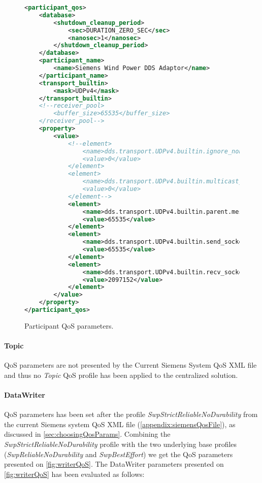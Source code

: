 \begin{figure}
\begin{lstlisting}[language=XML]
<participant_qos>
	<database>
		<shutdown_cleanup_period>
			<sec>DURATION_ZERO_SEC</sec>
			<nanosec>1</nanosec>
		</shutdown_cleanup_period>
	</database>
	<participant_name>
		<name>Siemens Wind Power DDS Adaptor</name>
	</participant_name>
	<transport_builtin>
		<mask>UDPv4</mask>
	</transport_builtin>
	<!--receiver_pool>
		<buffer_size>65535</buffer_size>
	</receiver_pool-->
	<property>
		<value>
			<!--element>
				<name>dds.transport.UDPv4.builtin.ignore_nonup_interfaces</name>
				<value>0</value>
			</element>
			<element>
				<name>dds.transport.UDPv4.builtin.multicast_enabled</name>
				<value>0</value>
			</element-->
			<element>
				<name>dds.transport.UDPv4.builtin.parent.message_size_max</name>
				<value>65535</value>
			</element>
			<element>
				<name>dds.transport.UDPv4.builtin.send_socket_buffer_size</name>
				<value>65535</value>
			</element>
			<element>
				<name>dds.transport.UDPv4.builtin.recv_socket_buffer_size</name>
				<value>2097152</value>
			</element>
		</value>
	</property>
</participant_qos>
\end{lstlisting}
\caption[Participant QoS parameters]{
		\label{fig:parQos} 
		\footnotesize{Participant QoS parameters.}
	}
\end{figure}

\paragraph{Topic} QoS parameters are not presented by the Current Siemens System QoS XML file and thus no \textit{Topic} QoS profile has been applied to the centralized solution. 

\paragraph{DataWriter} QoS parameters has been set after the profile \textit{SwpStrictReliableNoDurability} from the current Siemens system QoS XML file (\cref{appendix:siemensQosFile}), as discussed in \cref{sec:choosingQosParams}. Combining the \textit{SwpStrictReliableNoDurability} profile with the two underlying base profiles (\textit{SwpReliableNoDurability} and \textit{SwpBestEffort}) we get the QoS parameters presented on \cref{fig:writerQoS}. The DataWriter parameters presented on \cref{fig:writerQoS} has been evaluated as follows:

